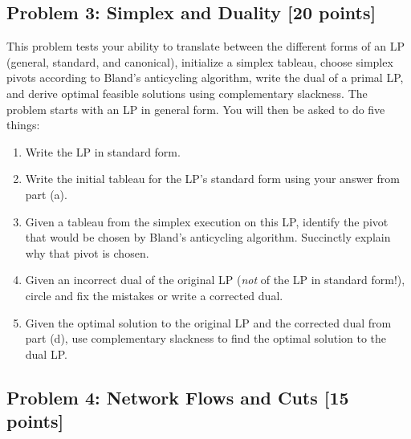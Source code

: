 \documentclass[10pt]{article}
\begin{document}
\subsection{Problem 3: Simplex and Duality [20 points]}

This problem tests your ability to translate between the different forms of an LP (general, standard, and canonical), initialize a simplex tableau, choose simplex pivots according to Bland's anticycling algorithm, write the dual of a primal LP, and derive optimal feasible solutions using complementary slackness.
The problem starts with an LP in general form. You will then be asked to do five things:
\begin{enumerate}[label=(\alph*)]
\item Write the LP in standard form.

\item Write the initial tableau for the LP's standard form using your answer from part (a).

\item Given a tableau from the simplex execution on this LP, identify the pivot that would be chosen by Bland's anticycling algorithm.
Succinctly explain why that pivot is chosen.

\item Given an incorrect dual of the original LP (\textit{not} of the LP in standard form!), circle and fix the mistakes or write a corrected dual.

\item Given the optimal solution to the original LP and the corrected dual from part (d), use complementary slackness to find the optimal solution to the dual LP.
\end{enumerate}

\subsection{Problem 4: Network Flows and Cuts [15 points]}
\end{document}

